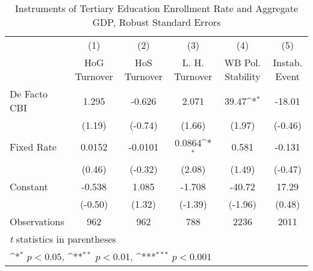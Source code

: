 \begin{table}[htbp]\centering
\def\sym#1{\ifmmode^{#1}\else\(^{#1}\)\fi}
\caption{Instruments of Tertiary Education Enrollment Rate and Aggregate GDP, Robust Standard Errors \label{ifivs2}}
\begin{tabular}{l*{5}{c}}
\toprule
                                        &\multicolumn{1}{c}{(1)}&\multicolumn{1}{c}{(2)}&\multicolumn{1}{c}{(3)}&\multicolumn{1}{c}{(4)}&\multicolumn{1}{c}{(5)}\\
                                        &\multicolumn{1}{c}{HoG Turnover}&\multicolumn{1}{c}{HoS Turnover}&\multicolumn{1}{c}{L. H. Turnover}&\multicolumn{1}{c}{WB Pol. Stability}&\multicolumn{1}{c}{Instab. Event}\\
\midrule
De Facto CBI                            &    1.295         &   -0.626         &    2.071         &    39.47\sym{*}  &   -18.01         \\
                                        &   (1.19)         &  (-0.74)         &   (1.66)         &   (1.97)         &  (-0.46)         \\
\addlinespace
Fixed Rate                              &   0.0152         &  -0.0101         &   0.0864\sym{*}  &    0.581         &   -0.131         \\
                                        &   (0.46)         &  (-0.32)         &   (2.08)         &   (1.49)         &  (-0.47)         \\
\addlinespace
Constant                                &   -0.538         &    1.085         &   -1.708         &   -40.72         &    17.29         \\
                                        &  (-0.50)         &   (1.32)         &  (-1.39)         &  (-1.96)         &   (0.48)         \\
\midrule
Observations                            &      962         &      962         &      788         &     2236         &     2011         \\
\bottomrule
\multicolumn{6}{l}{\footnotesize \textit{t} statistics in parentheses}\\
\multicolumn{6}{l}{\footnotesize \sym{*} \(p<0.05\), \sym{**} \(p<0.01\), \sym{***} \(p<0.001\)}\\
\end{tabular}
\end{table}
